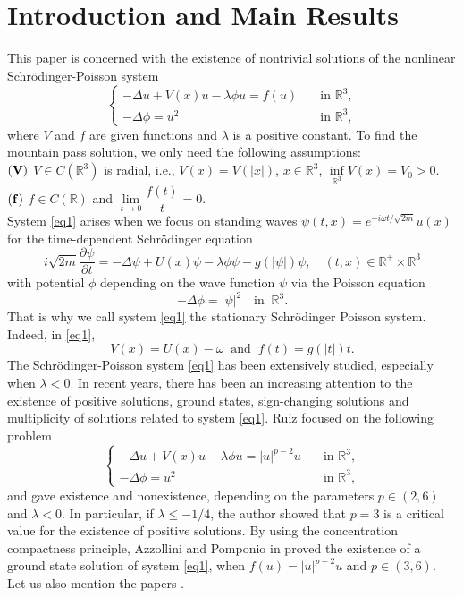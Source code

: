 \documentclass[12pt]{amsart}
\numberwithin{equation}{section}
\theoremstyle{definition}
\begin{document}
	\section{Introduction and Main Results}
This paper is concerned with the existence of nontrivial solutions of the nonlinear Schr\"{o}dinger-Poisson system 
\begin{equation}\label{eq1}
	\begin{cases}
			-\Delta u+V(x)u-\lambda \phi u=f(u)&\quad\text{in }\mathbb R^3,\\
		-\Delta\phi=u^2&\quad\text{in }\mathbb R^3,
	\end{cases}
\end{equation}
where $V$ and $f$ are given functions and $\lambda$ is a positive constant. To find the mountain pass solution, we only need the following assumptions:\\
${\bf (V)}$ $V\in C(\mathbb{R}^3)$ is radial, i.e., $V(x)=V(|x|)$, $x\in\mathbb R^3$, $\inf\limits_{\mathbb R^3} V(x)= V_0>0$.\\
${\bf (f)}$ $f\in C(\mathbb{R})$ and $\lim\limits_{t\rightarrow0}\dfrac{f(t)}{t}=0.$\\
System \eqref{eq1} arises when we focus on standing waves $\psi(t,x)=e^{-i\omega t/\sqrt{2m}}u(x)$ for the time-dependent Schr\"{o}dinger equation
$$i\sqrt{2m}\frac{\partial \psi}{\partial t}=-\Delta \psi+U(x)\psi-\lambda\phi \psi-g(|\psi|)\psi,\quad (t,x)\in \mathbb{R}^{+}\times \mathbb{R}^3 $$
with potential $\phi$ depending on the wave function $\psi$ via the Poisson equation
$$-\Delta\phi=|\psi|^{2} \quad \mbox{in }\ \mathbb{R}^3.$$
That is why we call system \eqref{eq1} the stationary Schr\"{o}dinger Poisson system. Indeed, in \eqref{eq1},
$$V(x) = U(x)-\omega\ \mbox{ and }\ f(t) = g(|t|)t.$$
The Schr\"{o}dinger-Poisson system  \eqref{eq1} has been extensively studied, especially when $\lambda<0$. In recent years, there has been an increasing attention to the existence of positive solutions, ground states, sign-changing solutions and multiplicity of solutions related to system \eqref{eq1}. Ruiz \cite{MR2230354} focused on the following problem
\begin{equation*}
	\begin{cases}
			-\Delta u+V(x)u-\lambda \phi u=|u|^{p-2}u &\quad\text{in }\mathbb R^3,\\
		-\Delta\phi=u^2 &\quad\text{in }\mathbb R^3,
	\end{cases}
\end{equation*}
and gave existence and nonexistence, depending on the parameters $p\in(2,6)$ and $\lambda<0$. In particular, if $\lambda\leq-1/4$, the author showed that $p = 3$ is a critical value for the existence of positive solutions. By using the concentration compactness principle, Azzollini
and Pomponio in \cite{MR2422637} proved the existence of a ground state solution of system \eqref{eq1}, when $f(u)=|u|^{p-2}u$ and $p\in(3,6)$. Let us also mention the papers \cite{MR3500305,MR4288156,MR4417277,MR4527586,MR4593001,MR4790968,MR4803693,MR2230354,MR2099569,MR1659454,MR2595202,MR2422637,MR2417922}.
\end{document}
